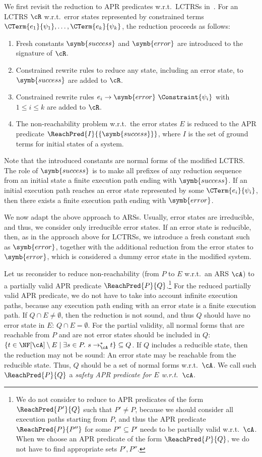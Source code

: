 We first revisit the reduction to APR predicates w.r.t.\ LCTRSs in~\cite{KN24jip}.
For an LCTRS $\cR$ w.r.t.\ error states represented by constrained terms $\CTerm{e_1}{\psi_1},\ldots,\CTerm{e_k}{\psi_k}$,
the reduction proceeds as follows:
\begin{enumerate}
	\item
	      Fresh constants $\symb{success}$ and $\symb{error}$ are introduced to the signature of $\cR$.
	\item
	      Constrained rewrite rules to reduce any state, including an error state, to $\symb{success}$ are added to $\cR$.
	\item
	      Constrained rewrite rules $e_i \to \symb{error} ~ \Constraint{\psi_i}$ with $1 \leq i \leq k$ are added to $\cR$.
	\item
	      The non-reachability problem w.r.t.\ the error states $E$ is reduced to
	      the APR predicate $\ReachPred{I}{\{\symb{success}\}}$, where $I$ is the set of ground terms for initial states of a system. \end{enumerate}
Note that the introduced constants are normal forms of the modified LCTRS.
The role of $\symb{success}$ is to make all prefixes of any reduction sequence from an initial state a finite execution path ending with $\symb{success}$.
If an initial execution path reaches an error state represented by some $\CTerm{e_i}{\psi_i}$, then there exists a finite execution path ending with $\symb{error}$.


We now adapt the above approach to ARSs.
Usually, error states are irreducible, and thus, we consider only irreducible error states.
If an error state is reducible, then, as in the approach above for LCTRSs, we introduce a fresh constant such as $\symb{error}$, together with the additional reduction from the error states to $\symb{error}$, which is considered a dummy error state in the modified system.

Let us reconsider to reduce non-reachability (from $P$ to $E$ w.r.t.\ an ARS $\cA$) to a partially valid APR predicate $\ReachPred{P}{Q}$.\footnote{We do not consider to reduce to APR predicates of the form $\ReachPred{P'}{Q}$ such that $P' \ne P$, because we should consider all execution paths starting from $P$, and thus the APR predicate $\ReachPred{P}{P''}$ for some $P'' \subseteq P'$ needs to be partially valid w.r.t.\ $\cA$.
	When we choose an APR predicate of the form $\ReachPred{P}{Q}$, we do not have to find appropriate sets $P',P''$.}
For the reduced partially valid APR predicate, we do not have to take into account infinite execution paths, because any execution path ending with an error state is a finite execution path.
If $Q \cap E \ne \emptyset$, then the reduction is not sound, and thus $Q$ should have no error state in $E$: $Q \cap E = \emptyset$.
For the partial validity, all normal forms that are reachable from $P$ and are not error states should be included in $Q$:
$\{ t \in \NF[\cA] \setminus E \mid \exists s \in P.\ s \to_\cA^* t \} \subseteq Q$.
If $Q$ includes a reducible state, then the reduction may not be sound:
An error state may be reachable from the reducible state.
Thus, $Q$ should be a set of normal forms w.r.t.\ $\cA$.
We call such $\ReachPred{P}{Q}$ a \emph{safety APR predicate for $E$ w.r.t.\ $\cA$}.

